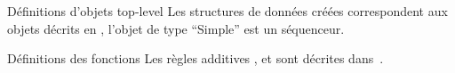 %
{}%
{Définitions d'objets top-level}%
{Les structures de données créées correspondent aux objets décrits en
  , l'objet de type ``Simple'' est un
  séquenceur.}

%
{}%
{Définitions des fonctions}%
{Les règles additives ,  et  sont
  décrites dans~\cite{Toffoli87}.}

